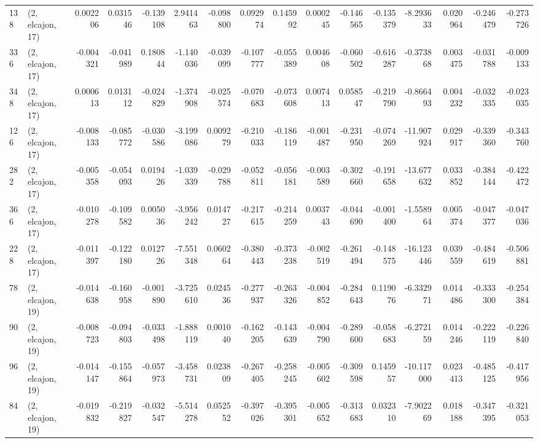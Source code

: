 \begin{tabular}{llrrrrrrrrrrrrrr}
138 &  (2, elcajon, 17) &   0.002206 &  0.031546 & -0.139108 &    2.941463 & -0.098800 &   0.092974 &  0.145992 &  0.000245 & -0.146565 & -0.135379 &   -8.293633 &  0.020964 & -0.246479 & -0.273726 \\
336 &  (2, elcajon, 17) &  -0.004321 & -0.041989 &  0.180844 &   -1.140036 & -0.039099 &  -0.107777 & -0.055389 &  0.004608 & -0.060502 & -0.616287 &   -0.373868 &  0.003475 & -0.031788 & -0.009133 \\
348 &  (2, elcajon, 17) &   0.000613 &  0.013112 & -0.024829 &   -1.374908 & -0.025574 &  -0.070683 & -0.073608 &  0.007413 &  0.058547 & -0.219790 &   -0.866493 &  0.004232 & -0.032335 & -0.023035 \\
126 &  (2, elcajon, 17) &  -0.008133 & -0.085772 & -0.030586 &   -3.199086 &  0.009279 &  -0.210033 & -0.186119 & -0.001487 & -0.231950 & -0.074269 &  -11.907924 &  0.029917 & -0.339360 & -0.343760 \\
282 &  (2, elcajon, 17) &  -0.005358 & -0.054093 &  0.019426 &   -1.039339 & -0.029788 &  -0.052811 & -0.056181 & -0.003589 & -0.302660 & -0.191658 &  -13.677632 &  0.033852 & -0.384144 & -0.422472 \\
366 &  (2, elcajon, 17) &  -0.010278 & -0.109582 &  0.005036 &   -3.956242 &  0.014727 &  -0.217615 & -0.214259 &  0.003743 & -0.044690 & -0.001400 &   -1.558964 &  0.005374 & -0.047377 & -0.047036 \\
228 &  (2, elcajon, 17) &  -0.011397 & -0.122180 &  0.012726 &   -7.551348 &  0.060264 &  -0.380443 & -0.373238 & -0.002519 & -0.261494 & -0.148575 &  -16.123446 &  0.039559 & -0.484619 & -0.506881 \\
78  &  (2, elcajon, 19) &  -0.014638 & -0.160958 & -0.001890 &   -3.725610 &  0.024536 &  -0.277937 & -0.263326 & -0.004852 & -0.284643 &  0.119076 &   -6.332971 &  0.014486 & -0.333300 & -0.254384 \\
90  &  (2, elcajon, 19) &  -0.008723 & -0.094803 & -0.033498 &   -1.888119 &  0.001040 &  -0.162205 & -0.143639 & -0.004790 & -0.289600 & -0.058683 &   -6.272159 &  0.014246 & -0.222119 & -0.226840 \\
96  &  (2, elcajon, 19) &  -0.014147 & -0.155864 & -0.057973 &   -3.458731 &  0.023809 &  -0.267405 & -0.258245 & -0.005602 & -0.309598 &  0.145957 &  -10.117000 &  0.023413 & -0.485125 & -0.417956 \\
84  &  (2, elcajon, 19) &  -0.019832 & -0.219827 & -0.032547 &   -5.514278 &  0.052552 &  -0.397026 & -0.395301 & -0.005652 & -0.313683 &  0.032310 &   -7.902269 &  0.018188 & -0.347395 & -0.321053 \\

\end{tabular}
